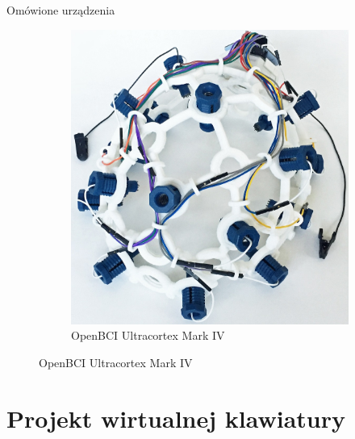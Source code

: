 \documentclass[10pt,aspectratio=169]{beamer}
\begin{document}
\begin{frame}{Omówione urządzenia}
\begin{figure}[htb]
\begin{subfigure}{0.2\linewidth}
    \includegraphics[width=\linewidth,keepaspectratio]{obrazy/markiv}
    \caption{OpenBCI Ultracortex Mark IV}
    \end{subfigure}\hspace*{\fill}
  \end{figure}
\end{frame}

\section{Projekt wirtualnej klawiatury}
\end{document}
